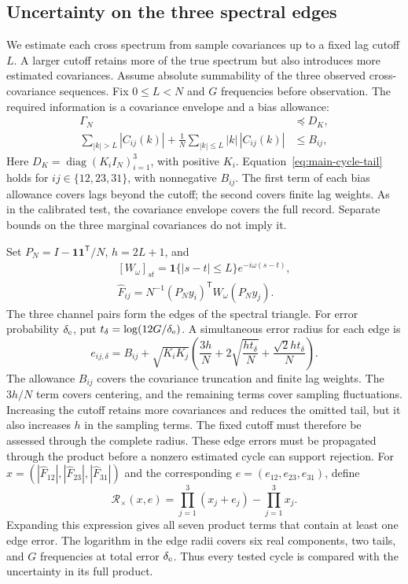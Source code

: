 \subsection{Uncertainty on the three spectral edges}
We estimate each cross spectrum from sample covariances up to a fixed lag cutoff $L$. A larger cutoff retains more of the true spectrum but also introduces more estimated covariances. Assume absolute summability of the three observed cross-covariance sequences. Fix $0\le L<N$ and $G$ frequencies before observation. The required information is a covariance envelope and a bias allowance:
\begin{align}
 \Gamma_N&\preceq D_K,\label{eq:cycle-diagonal}\\
 \sum_{|k|>L}|C_{ij}(k)|+
 \frac1N\sum_{|k|\le L}|k|\,|C_{ij}(k)|&\le B_{ij},
\label{eq:main-cycle-tail}
\end{align}
Here $D_K=\operatorname{diag}(K_iI_N)_{i=1}^3$, with positive $K_i$. Equation~\eqref{eq:main-cycle-tail} holds for $ij\in\{12,23,31\}$, with nonnegative $B_{ij}$. The first term of each bias allowance covers lags beyond the cutoff; the second covers finite lag weights. As in the calibrated test, the covariance envelope covers the full record. Separate bounds on the three marginal covariances do not imply it.

Set $P_N=I-\mathbf1\mathbf1^{\mathsf T}/N$, $h=2L+1$, and
\[
 \begin{gathered}
 [W_\omega]_{st}=\mathbf1\{|s-t|\le L\}e^{-i\omega(s-t)},\\
 \widehat F_{ij}=N^{-1}(P_Ny_i)^{\mathsf T}W_\omega(P_Ny_j).
 \end{gathered}
\]
The three channel pairs form the edges of the spectral triangle. For error probability $\delta_{\rm e}$, put $t_\delta=\log(12G/\delta_{\rm e})$. A simultaneous error radius for each edge is
\begin{equation}
 e_{ij,\delta}=B_{ij}+\sqrt{K_iK_j}
 \left(\frac{3h}{N}+2\sqrt{\frac{ht_\delta}{N}}
                  +\frac{\sqrt2 ht_\delta}{N}\right).
 \label{eq:main-cycle-radius}
\end{equation}
The allowance $B_{ij}$ covers the covariance truncation and finite lag weights. The $3h/N$ term covers centering, and the remaining terms cover sampling fluctuations. Increasing the cutoff retains more covariances and reduces the omitted tail, but it also increases $h$ in the sampling terms. The fixed cutoff must therefore be assessed through the complete radius. These edge errors must be propagated through the product before a nonzero estimated cycle can support rejection. For $x=(|\widehat F_{12}|,|\widehat F_{23}|,|\widehat F_{31}|)$ and the corresponding $e=(e_{12},e_{23},e_{31})$, define
\begin{equation}
 \mathcal R_\times(x,e)=\prod_{j=1}^3(x_j+e_j)-\prod_{j=1}^3x_j.
 \label{eq:cycle-product-radius}
\end{equation}
Expanding this expression gives all seven product terms that contain at least one edge error. The logarithm in the edge radii covers six real components, two tails, and $G$ frequencies at total error $\delta_{\rm e}$. Thus every tested cycle is compared with the uncertainty in its full product.

